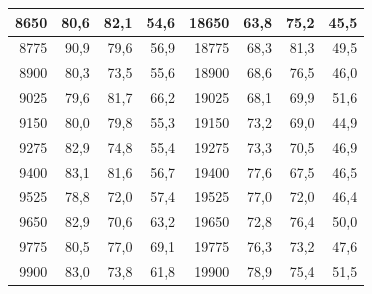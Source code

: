 \begin{small}
\begin{longtable}{|r|r|r|r|r|r|r|r|}
8650 & 80,6 & 82,1 & 54,6 & 18650 & 63,8 & 75,2 & 45,5 \\ \hline
8775 & 90,9 & 79,6 & 56,9 & 18775 & 68,3 & 81,3 & 49,5 \\ \hline
8900 & 80,3 & 73,5 & 55,6 & 18900 & 68,6 & 76,5 & 46,0 \\ \hline
9025 & 79,6 & 81,7 & 66,2 & 19025 & 68,1 & 69,9 & 51,6 \\ \hline
9150 & 80,0 & 79,8 & 55,3 & 19150 & 73,2 & 69,0 & 44,9 \\ \hline
9275 & 82,9 & 74,8 & 55,4 & 19275 & 73,3 & 70,5 & 46,9 \\ \hline
9400 & 83,1 & 81,6 & 56,7 & 19400 & 77,6 & 67,5 & 46,5 \\ \hline
9525 & 78,8 & 72,0 & 57,4 & 19525 & 77,0 & 72,0 & 46,4 \\ \hline
9650 & 82,9 & 70,6 & 63,2 & 19650 & 72,8 & 76,4 & 50,0 \\ \hline
9775 & 80,5 & 77,0 & 69,1 & 19775 & 76,3 & 73,2 & 47,6 \\ \hline
9900 & 83,0 & 73,8 & 61,8 & 19900 & 78,9 & 75,4 & 51,5 \\ \hline
\end{longtable}
\end{small}